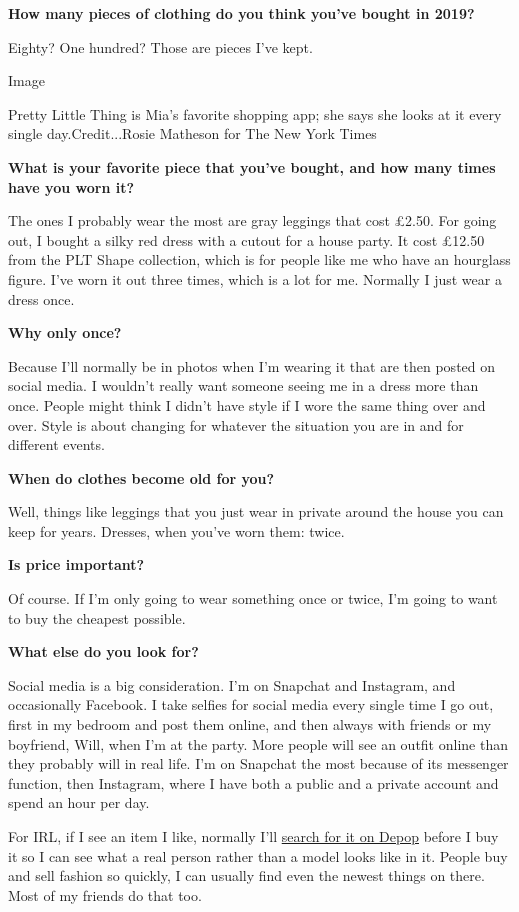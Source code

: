 \textbf{How many pieces of clothing do you think you've bought in 2019?}

Eighty? One hundred? Those are pieces I've kept.

Image

Pretty Little Thing is Mia's favorite shopping app; she says she looks
at it every single day.Credit...Rosie Matheson for The New York Times

\textbf{What is your favorite piece that you've bought, and how many
times have you worn it?}

The ones I probably wear the most are gray leggings that cost £2.50. For
going out, I bought a silky red dress with a cutout for a house party.
It cost £12.50 from the PLT Shape collection, which is for people like
me who have an hourglass figure. I've worn it out three times, which is
a lot for me. Normally I just wear a dress once.

\textbf{Why only once?}

Because I'll normally be in photos when I'm wearing it that are then
posted on social media. I wouldn't really want someone seeing me in a
dress more than once. People might think I didn't have style if I wore
the same thing over and over. Style is about changing for whatever the
situation you are in and for different events.

\textbf{When do clothes become old for you?}

Well, things like leggings that you just wear in private around the
house you can keep for years. Dresses, when you've worn them: twice.

\textbf{Is price important?}

Of course. If I'm only going to wear something once or twice, I'm going
to want to buy the cheapest possible.

\textbf{What else do you look for?}

Social media is a big consideration. I'm on Snapchat and Instagram, and
occasionally Facebook. I take selfies for social media every single time
I go out, first in my bedroom and post them online, and then always with
friends or my boyfriend, Will, when I'm at the party. More people will
see an outfit online than they probably will in real life. I'm on
Snapchat the most because of its messenger function, then Instagram,
where I have both a public and a private account and spend an hour per
day.

For IRL, if I see an item I like, normally I'll
\href{https://www.nytimes.com/2019/07/09/style/internet-girl-depop.html}{search
for it on Depop} before I buy it so I can see what a real person rather
than a model looks like in it. People buy and sell fashion so quickly, I
can usually find even the newest things on there. Most of my friends do
that too.

